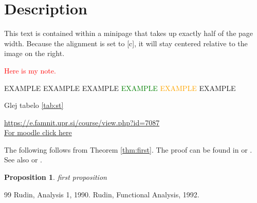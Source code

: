 \documentclass[11pt,a4paper]{article}
\newcommand{\CR}{\textcolor{red}}
\theoremstyle{plain}
\newtheorem{proposition}[theorem]{Proposition}
\theoremstyle{definition}
\theoremstyle{plain}
\theoremstyle{definition}
\begin{document}
\noindent
\begin{minipage}[c]{0.5\textwidth}
	\section*{Description}
	This text is contained within a minipage that takes up exactly 
	half of the page width. Because the alignment is set to [c], 
	it will stay centered relative to the image on the right.
\end{minipage}
\hfill
\begin{minipage}[c]{0.4\textwidth}
	\centering
\end{minipage}

\CR{Here is my note.}

\textcolor{blue!80}{EXAMPLE}
\textcolor{blue!80!black}{EXAMPLE}
\textcolor{blue!20!black!30!green}{EXAMPLE}
\textcolor{green}{EXAMPLE}
\textcolor{orange}{EXAMPLE}
\textcolor{yellow!50!}{EXAMPLE}


Glej tabelo \ref{tab:st}

\url{https://e.famnit.upr.si/course/view.php?id=7087}\\
\href{https://e.famnit.upr.si/course/view.php?id=7087}{For moodle click here}

\vspace{2cm}




\vspace{3cm}

The following follows from Theorem \ref{thm:first}. The proof can be found in \cite{rudin} or \cite{rudin2}. See also \cite[Section 3]{rudin} or \cite[Theorem 2.6]{rudin2}. 

\begin{proposition}
	first proposition
\end{proposition}

\tableofcontents

\printindex


\begin{thebibliography}{99}
	 Rudin,  Analysis 1, 1990.
	 Rudin, Functional Analysis, 1992.
\end{thebibliography}











	
\end{document}
